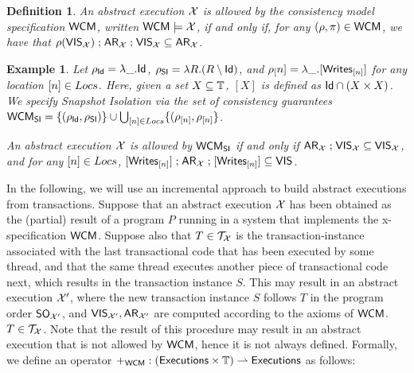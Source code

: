 \documentclass[a4paper,UKenglish]{article}%
\theoremstyle{plain}
\newtheorem{definition}[theorem]{Definition}
\newtheorem{example}[thm]{\sc Example}
\begin{document}
\begin{definition}
An abstract execution $\mathcal{X}$ is allowed by the consistency model specification $\mathsf{WCM}$, 
written $\mathsf{WCM} \models \mathcal{X}$, if and only if, for any $(\rho, \pi) \in \mathsf{WCM}$, we have that $\rho({\mathsf{VIS}}_{\mathcal{X}}) \mathrel{;} {\sf{AR}}_{\mathcal{X}} 
\mathrel{;} {\mathsf{VIS}}_{\mathcal{X}} \subseteq {\sf{AR}}_{\mathcal{X}}$.
\end{definition}

\begin{example}
Let $\rho_{\mathsf{Id}} = \lambda \_. \mathsf{Id}$, $\rho_{\mathsf{SI}} = \lambda R. (R \setminus \mathsf{Id})$, and $\rho_[n] = 
\lambda \_. [{\sf{Writes}}_{[n]}]$ for any location $[n] \in Locs$. Here, given a set $X \subseteq \mathbb{T}$, 
$[X]$ is defined as $\mathsf{Id} \cap (X \times X)$. We specify \emph{Snapshot Isolation} via the set 
of consistency guarantees $\mathsf{WCM}_{\mathsf{SI}} = \{(\rho_{\mathsf{Id}}, \rho_{\mathsf{SI}})\} \cup \bigcup_{[n] \in Locs} \{(\rho_{[n]}, \rho_{[n]}\}$. 

An abstract execution $\mathcal{X}$ is allowed by $\mathsf{WCM}_{\mathsf{SI}}$ if and only if 
${\sf{AR}}_{\mathcal{X}} \mathrel{;} {\mathsf{VIS}}_{\mathcal{X}} \subseteq {\mathsf{VIS}}_{\mathcal{X}}$, 
and for any $[n] \in Locs$, $[{\sf{Writes}}_{[n]}] \mathrel{;} {\sf{AR}}_{\mathcal{X}} \mathrel{;} [{\sf{Writes}}_{[n]}] \subseteq {\mathsf{VIS}}$.
\end{example}

In the following, we will use an incremental approach to build abstract executions from transactions. 
Suppose that an abstract execution $\mathcal{X}$ has been obtained as the (partial) result of a program $P$ running 
in a system that implements the x-specification $\mathsf{WCM}$. 
Suppose also that $T \in \mathcal{T}_{\mathcal{X}}$ is the transaction-instance associated with the last transactional 
code that has been executed by some thread, and that the same thread executes another piece of transactional 
code next, which results in the transaction instance $S$. This may result in an abstract execution $\mathcal{X}'$, 
where the new transaction instance $S$ follows $T$ in the program order ${\sf{SO}}_{\mathcal{X}'}$, and ${\mathsf{VIS}}_{\mathcal{X}'}, 
{\sf{AR}}_{\mathcal{X}'}$ are computed according to the axioms of $\mathsf{WCM}$.
$T \in \mathcal{T}_{\mathcal{X}}$. Note that the result of this procedure may result in an abstract execution that 
is not allowed by $\mathsf{WCM}$, hence it is not always defined.
Formally, we define an operator $+_{\mathsf{WCM}} : ({\mathsf{Executions}} \times \mathbb{T}) \rightharpoonup 
{\mathsf{Executions}}$ as follows:
\end{document}
